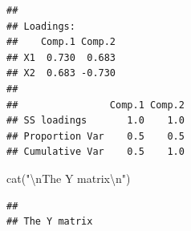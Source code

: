 \documentclass[
]{article}
\newenvironment{Shaded}{\begin{snugshade}}{\end{snugshade}}
\newcommand{\FunctionTok}[1]{\textcolor[rgb]{0.00,0.00,0.00}{#1}}
\newcommand{\NormalTok}[1]{#1}
\newcommand{\SpecialCharTok}[1]{\textcolor[rgb]{0.00,0.00,0.00}{#1}}
\newcommand{\StringTok}[1]{\textcolor[rgb]{0.31,0.60,0.02}{#1}}
\begin{document}
\begin{verbatim}
## 
## Loadings:
##    Comp.1 Comp.2
## X1  0.730  0.683
## X2  0.683 -0.730
## 
##                Comp.1 Comp.2
## SS loadings       1.0    1.0
## Proportion Var    0.5    0.5
## Cumulative Var    0.5    1.0
\end{verbatim}

\begin{Shaded}
\begin{Highlighting}[]
\FunctionTok{cat}\NormalTok{(}\StringTok{"}\SpecialCharTok{\textbackslash{}n}\StringTok{The Y matrix}\SpecialCharTok{\textbackslash{}n}\StringTok{"}\NormalTok{)}
\end{Highlighting}
\end{Shaded}

\begin{verbatim}
## 
## The Y matrix
\end{verbatim}

\begin{Shaded}
\end{Shaded}
\end{document}
